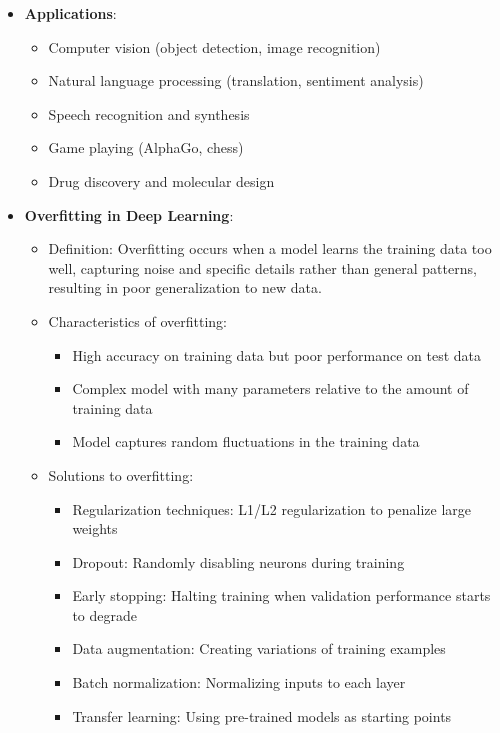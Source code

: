 \documentclass{article}
\begin{document}
\begin{itemize}
    \item \textbf{Applications}:
    \begin{itemize}
        \item Computer vision (object detection, image recognition)
        \item Natural language processing (translation, sentiment analysis)
        \item Speech recognition and synthesis
        \item Game playing (AlphaGo, chess)
        \item Drug discovery and molecular design
    \end{itemize}
    
    \item \textbf{Overfitting in Deep Learning}:
    \begin{itemize}
        \item Definition: Overfitting occurs when a model learns the training data too well, capturing noise and specific details rather than general patterns, resulting in poor generalization to new data.
        
        \item Characteristics of overfitting:
        \begin{itemize}
            \item High accuracy on training data but poor performance on test data
            \item Complex model with many parameters relative to the amount of training data
            \item Model captures random fluctuations in the training data
        \end{itemize}
        
        \item Solutions to overfitting:
        \begin{itemize}
            \item Regularization techniques: L1/L2 regularization to penalize large weights
            \item Dropout: Randomly disabling neurons during training
            \item Early stopping: Halting training when validation performance starts to degrade
            \item Data augmentation: Creating variations of training examples
            \item Batch normalization: Normalizing inputs to each layer
            \item Transfer learning: Using pre-trained models as starting points
        \end{itemize}
    \end{itemize}
\end{itemize}
\end{document}

